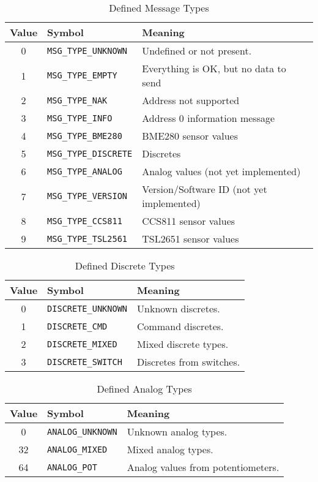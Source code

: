 \documentclass[10pt, openany, draft]{article}
\begin{document}
\begin{table}
  \centering
  \begin{tabular}{c l l}
    \hline
    Value & Symbol & Meaning \\
    \hline
    0 & \texttt{MSG\_TYPE\_UNKNOWN} & Undefined or not present.\\
    1 & \texttt{MSG\_TYPE\_EMPTY} & Everything is OK, but no data to send \\
    2 & \texttt{MSG\_TYPE\_NAK} & Address not supported \\
    3 & \texttt{MSG\_TYPE\_INFO} & Address 0 information message \\
    4 & \texttt{MSG\_TYPE\_BME280} & BME280 sensor values \\
    5 & \texttt{MSG\_TYPE\_DISCRETE} & Discretes \\
    6 & \texttt{MSG\_TYPE\_ANALOG} & Analog values (not yet implemented) \\
    7 & \texttt{MSG\_TYPE\_VERSION} & Version/Software ID (not yet implemented) \\
    8 & \texttt{MSG\_TYPE\_CCS811} & CCS811 sensor values \\
    9 & \texttt{MSG\_TYPE\_TSL2561} & TSL2651 sensor values \\
  \end{tabular}
  \caption{Defined Message Types}
  \label{tab:messagetype}
\end{table}

\begin{table}
  \centering
  \begin{tabular}{c l l}
    \hline
    Value & Symbol & Meaning \\
    \hline
    0 & \texttt{DISCRETE\_UNKNOWN} & Unknown discretes.\\
    1 & \texttt{DISCRETE\_CMD} & Command discretes.\\
    2 & \texttt{DISCRETE\_MIXED} & Mixed discrete types.\\
    3 & \texttt{DISCRETE\_SWITCH} & Discretes from switches.\\
  \end{tabular}
  \caption{Defined Discrete Types}
  \label{tab:disctype}
\end{table}

\begin{table}
  \centering
  \begin{tabular}{c l l}
    \hline
    Value & Symbol & Meaning \\
    \hline
    0 & \texttt{ANALOG\_UNKNOWN} & Unknown analog types.\\
    32 & \texttt{ANALOG\_MIXED} & Mixed analog types.\\
    64 & \texttt{ANALOG\_POT} & Analog values from potentiometers.\\
  \end{tabular}
  \caption{Defined Analog Types}
  \label{tab:analogtype}
\end{table}
\end{document}
